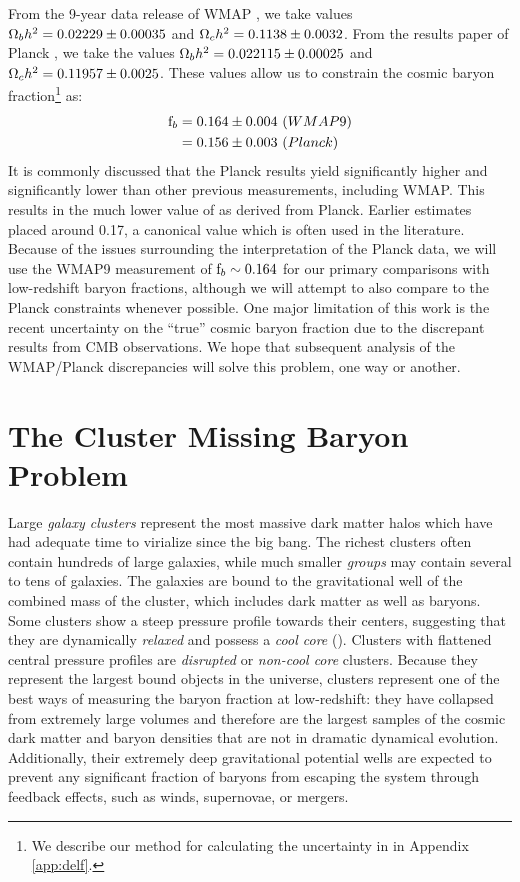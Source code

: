 From the 9-year data release of WMAP \citep[WMAP9,][]{Hinshaw2013}, we
take values $\Omega_b h^2 = 0.02229 \pm 0.00035$ and $\Omega_c h^2 =
0.1138 \pm 0.0032$. From the results paper of Planck
\citep{PlanckResultsXVI}, we take the values $\Omega_b h^2 = 0.022115
\pm 0.00025$ and $\Omega_c h^2 = 0.11957 \pm 0.0025$. These values
allow us to constrain the cosmic baryon fraction\footnote{We describe
  our method for calculating the uncertainty in \fb{} in Appendix
  \ref{app:delf}.} as:
\begin{align}
\textrm{f\ensuremath{_b}} &= 0.164 \pm 0.004 \,\,(WMAP9) \nonumber\\
&= 0.156 \pm 0.003 \,\,(Planck) \nonumber
\end{align}
It is commonly discussed  that the Planck
results yield \omegam{} significantly higher and \Ho{} significantly
lower than other previous measurements, including WMAP. This results
in the much lower value of \fb{} as derived from Planck. Earlier
estimates \citep[e.g.,WMAP5,][]{Dunkley2009} placed \fb{}
around 0.17, a canonical value which is often used in the
literature. Because of the issues surrounding the interpretation of
the Planck data, we will use the WMAP9 measurement of $\textrm{f\ensuremath{_b}}{}\sim0.164$
for our primary comparisons with low-redshift baryon fractions,
although we will attempt to also compare to the Planck constraints
whenever possible. One major limitation of this work is the recent
uncertainty on the ``true'' cosmic baryon fraction due to the
discrepant results from CMB observations. We hope that subsequent
analysis of the WMAP/Planck discrepancies will solve this problem, one
way or another.

\section{The Cluster Missing Baryon Problem}
\label{sec:Missing.Clusters}

Large \textit{galaxy clusters} represent the most massive dark matter
halos which have had adequate time to virialize since the big
bang. The richest clusters often contain hundreds of large galaxies,
while much smaller \textit{groups} may contain several to tens of
galaxies. The galaxies are bound to the gravitational well of the
combined mass of the cluster, which includes dark matter as well as
baryons. Some clusters show a steep pressure profile towards their
centers, suggesting that they are dynamically \textit{relaxed} and
possess a \textit{cool core} (). Clusters with
flattened central pressure profiles are \textit{disrupted}  or
\textit{non-cool core} clusters. Because they represent the largest
bound objects in the universe, clusters represent one of the best ways
of measuring the baryon fraction at low-redshift: they have collapsed
from extremely large volumes and therefore are the largest samples of
the cosmic dark matter and baryon densities that are not in dramatic
dynamical evolution. Additionally, their extremely deep gravitational
potential wells are expected to prevent any significant fraction of
baryons from escaping the system through feedback effects, such as
winds, supernovae, or mergers.

